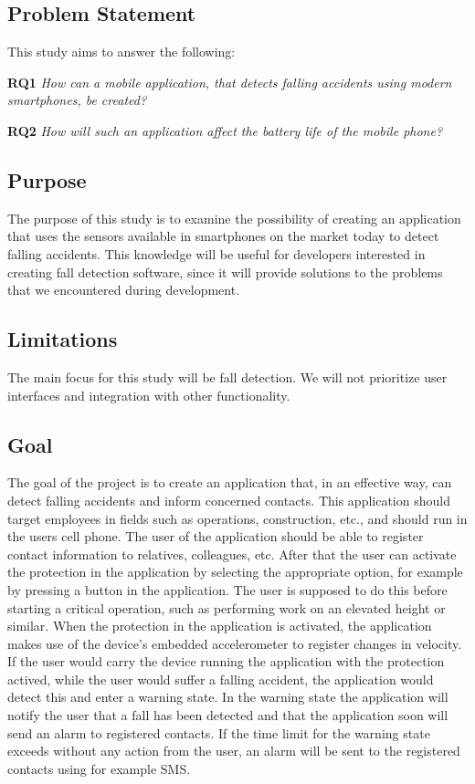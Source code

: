 \documentclass[12pt, a4paper, onecolumn]{article}
\begin{document}
		\subsection{Problem Statement}
		
		This study aims to answer the following:
		
		\textbf{RQ1} \textit{How can a mobile application, that detects falling accidents using modern smartphones, be created?}
		
		\textbf{RQ2} \textit{How will such an application affect the battery life of the mobile phone?}
		
		
		\subsection{Purpose}
		
		The purpose of this study is to examine the possibility of creating an application that uses the sensors available in smartphones on the market today to detect falling accidents. This knowledge will be useful for developers interested in creating fall detection software, since it will provide solutions to the problems that we encountered during development.
		
		\subsection{Limitations}

		The main focus for this study will be fall detection. We will not prioritize user interfaces and integration with other functionality.
		
		\subsection{Goal}
		
		The goal of the project is to create an application that, in an effective way, can detect falling accidents and inform concerned contacts. This application should target employees in fields such as operations, construction, etc., and should run in the users cell phone. The user of the application should be able to register contact information to relatives, colleagues, etc. After that the user can activate the protection in the application by selecting the appropriate option, for example by pressing a button in the application. The user is supposed to do this before starting a critical operation, such as performing work on an elevated height or similar. When the protection in the application is activated, the application makes use of the device's embedded accelerometer to register changes in velocity. If the user would carry the device running the application with the protection actived, while the user would suffer a falling accident, the application would detect this and enter a warning state. In the warning state the application will notify the user that a fall has been detected and that the application soon will send an alarm to registered contacts. If the time limit for the warning state exceeds without any action from the user, an alarm will be sent to the registered contacts using for example SMS.
		
\end{document}
